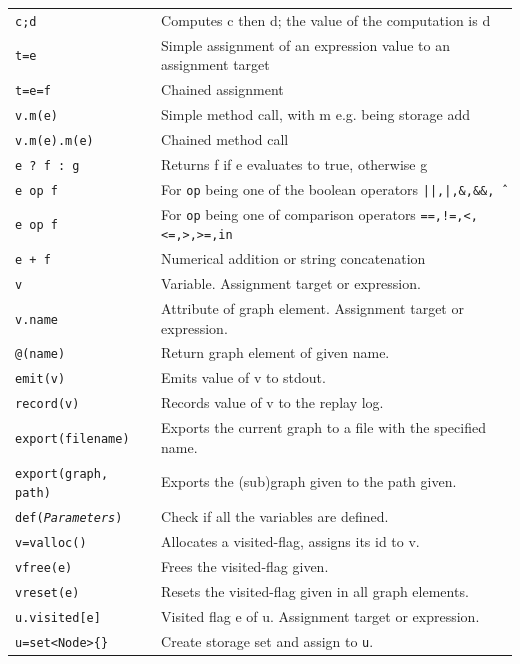 \begin{table}[htbp]
\begin{minipage}{\linewidth} \renewcommand{\footnoterule}{} 
\begin{tabularx}{\linewidth}{|lX|}
\hline
\texttt{c;d}	& Computes c then d; the value of the computation is d\\
\texttt{t=e}	& Simple assignment of an expression value to an assignment target\\
\texttt{t=e=f}	& Chained assignment \\
\texttt{v.m(e)}	& Simple method call, with m e.g. being storage add \\
\texttt{v.m(e).m(e)}	& Chained method call\\
\hline
\texttt{e ? f : g}	& Returns f if e evaluates to true, otherwise g \\
\texttt{e op f}	& For \texttt{op} being one of the boolean operators \texttt{||,|,\&,\&\&,\^\ } \\
\texttt{e op f}	& For \texttt{op} being one of comparison operators \texttt{==,!=,<,<=,>,>=,in} \\
\texttt{e + f}	& Numerical addition or string concatenation \\
\hline
\texttt{v} & Variable. Assignment target or expression.\\
\texttt{v.name} & Attribute of graph element. Assignment target or expression.\\
\texttt{@(name)} & Return graph element of given name.\\
\texttt{emit(v)} & Emits value of v to stdout.\\
\texttt{record(v)} & Records value of v to the replay log.\\
\texttt{export(filename)} & Exports the current graph to a file with the specified name. \\
\texttt{export(graph, path)} & Exports the (sub)graph given to the path given.\\
\texttt{def(\emph{Parameters})} & Check if all the variables are defined.\\
\hline
\texttt{v=valloc()} & Allocates a visited-flag, assigns its id to v.\\
\texttt{vfree(e)} & Frees the visited-flag given.\\
\texttt{vreset(e)} & Resets the visited-flag given in all graph elements.\\
\texttt{u.visited[e]} & Visited flag e of u. Assignment target or expression.\\
\hline
\texttt{u=set<Node>\{\}}	& Create storage set and assign to \texttt{u}.\\

\end{tabularx}
\end{minipage}
\end{table}
